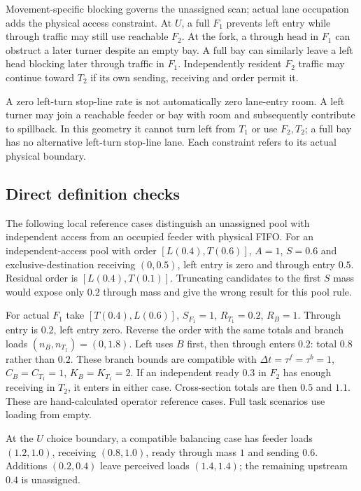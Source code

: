 \documentclass[10pt,a4paper]{article}
\begin{document}
Movement-specific blocking governs the unassigned scan; actual lane
occupation adds the physical access constraint. At $U$, a full $F_1$
prevents left entry while through traffic may still use reachable $F_2$.
At the fork, a through head in $F_1$ can obstruct a later turner despite
an empty bay. A full bay can similarly leave a left head blocking later
through traffic in $F_1$. Independently resident $F_2$ traffic may continue
toward $T_2$ if its own sending, receiving and order permit it.

A zero left-turn stop-line rate is not automatically zero lane-entry room.
A left turner may join a reachable feeder or bay with room and subsequently
contribute to spillback. In this geometry it cannot turn left from $T_1$
or use $F_2,T_2$; a full bay has no alternative left-turn stop-line lane.
Each constraint refers to its actual physical boundary.

\subsection*{Direct definition checks}

The following local reference cases distinguish an unassigned pool with
independent access from an occupied feeder with physical FIFO.
For an independent-access pool with order $[L(0.4),T(0.6)]$, $A=1$,
$S=0.6$ and exclusive-destination receiving $(0,0.5)$, left entry is
zero and through entry $0.5$. Residual order is $[L(0.4),T(0.1)]$.
Truncating candidates to the first $S$ mass would expose only $0.2$
through mass and give the wrong result for this pool rule.

For actual $F_1$ take $[T(0.4),L(0.6)]$, $S_{F_1}=1$, $R_{T_1}=0.2$,
$R_B=1$. Through entry is $0.2$, left entry zero.
Reverse the order with the same totals and branch loads
$(n_B,n_{T_1})=(0,1.8)$. Left uses $B$ first, then through enters $0.2$:
total $0.8$ rather than $0.2$.
These branch bounds are compatible with
$\Delta t=\tau^f=\tau^b=1$, $C_B=C_{T_1}=1$, $K_B=K_{T_1}=2$.
If an independent ready $0.3$ in $F_2$ has enough receiving in $T_2$,
it enters in either case. Cross-section totals are then $0.5$ and $1.1$.
These are hand-calculated operator reference cases. Full task scenarios
use loading from empty.

At the $U$ choice boundary, a compatible balancing case has feeder loads
$(1.2,1.0)$, receiving $(0.8,1.0)$, ready through mass $1$ and sending $0.6$.
Additions $(0.2,0.4)$ leave perceived loads $(1.4,1.4)$;
the remaining upstream $0.4$ is unassigned.
\end{document}

